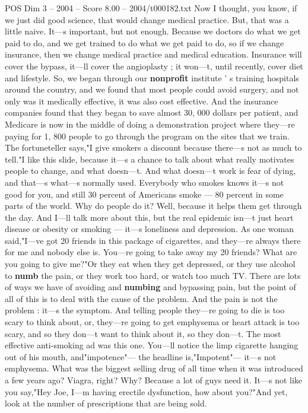 \begin{textsample}{POS Dim 3 – 2004 – Score 8.00 – 2004/t000182.txt}
Now I thought, you know, if we just did good science, that would change medical practice.
But, that was a little naive.
It—s important, but not enough.
Because we doctors do what we get paid to do, and we get trained to do what we get paid to do, so if we change insurance, then we change medical practice and medical education.
Insurance will cover the bypass, it—ll cover the angioplasty ; it won—t, until recently, cover diet and lifestyle.
So, we began through our \textbf{nonprofit} institute ' s training hospitals around the country, and we found that most people could avoid surgery, and not only was it medically effective, it was also cost effective.
And the insurance companies found that they began to save almost 30, 000 dollars per patient, and Medicare is now in the middle of doing a demonstration project where they—re paying for 1, 800 people to go through the program on the sites that we train.
The fortuneteller says,"I give smokers a discount because there—s not as much to tell."I like this slide, because it—s a chance to talk about what really motivates people to change, and what doesn—t.
And what doesn—t work is fear of dying, and that—s what—s normally used.
Everybody who smokes knows it—s not good for you, and still 30 percent of Americans smoke — 80 percent in some parts of the world.
Why do people do it?
Well, because it helps them get through the day.
And I—ll talk more about this, but the real epidemic isn—t just heart disease or obesity or smoking — it—s loneliness and depression.
As one woman said,"I—ve got 20 friends in this package of cigarettes, and they—re always there for me and nobody else is.
You—re going to take away my 20 friends?
What are you going to give me?"Or they eat when they get depressed, or they use alcohol to \textbf{numb} the pain, or they work too hard, or watch too much TV.
There are lots of ways we have of avoiding and \textbf{numbing} and bypassing pain, but the point of all of this is to deal with the cause of the problem.
And the pain is not the problem : it—s the symptom.
And telling people they—re going to die is too scary to think about, or, they—re going to get emphysema or heart attack is too scary, and so they don—t want to think about it, so they don—t.
The most effective anti-smoking ad was this one.
You—ll notice the limp cigarette hanging out of his mouth, and"impotence"— the headline is,"Impotent"— it—s not emphysema.
What was the biggest selling drug of all time when it was introduced a few years ago?
Viagra, right?
Why?
Because a lot of guys need it.
It—s not like you say,"Hey Joe, I—m having erectile dysfunction, how about you?"And yet, look at the number of prescriptions that are being sold.

\end{textsample}
